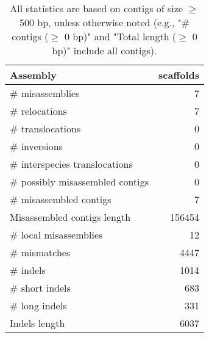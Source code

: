 \documentclass[12pt,a4paper]{article}
\begin{document}
\begin{table}[ht]
\begin{center}
\caption{All statistics are based on contigs of size $\geq$ 500 bp, unless otherwise noted (e.g., "\# contigs ($\geq$ 0 bp)" and "Total length ($\geq$ 0 bp)" include all contigs).}
\begin{tabular}{|l*{1}{|r}|}
\hline
Assembly & scaffolds \\ \hline
\# misassemblies & 7 \\ \hline
\hspace{5mm}\# relocations & 7 \\ \hline
\hspace{5mm}\# translocations & 0 \\ \hline
\hspace{5mm}\# inversions & 0 \\ \hline
\hspace{5mm}\# interspecies translocations & 0 \\ \hline
\# possibly misassembled contigs & 0 \\ \hline
\# misassembled contigs & 7 \\ \hline
Misassembled contigs length & 156454 \\ \hline
\# local misassemblies & 12 \\ \hline
\# mismatches & 4447 \\ \hline
\# indels & 1014 \\ \hline
\hspace{5mm}\# short indels & 683 \\ \hline
\hspace{5mm}\# long indels & 331 \\ \hline
Indels length & 6037 \\ \hline
\end{tabular}
\end{center}
\end{table}
\end{document}
